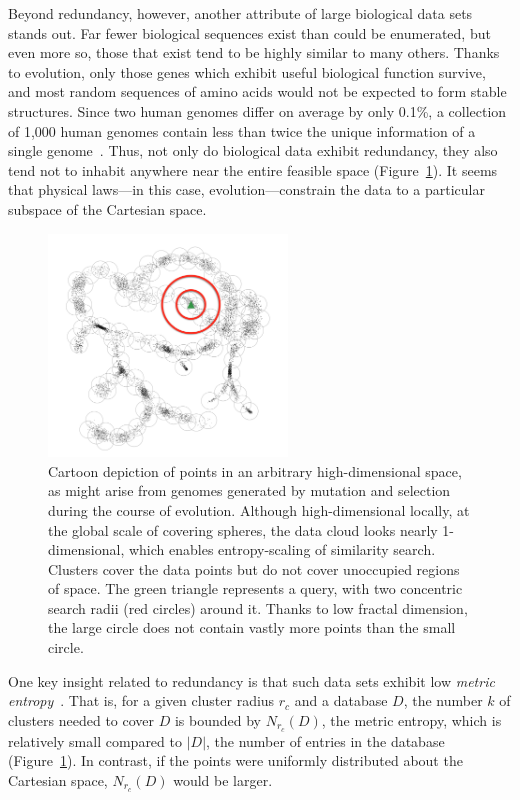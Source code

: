 \documentclass{acm_proc_article-sp}
\begin{document}
Beyond redundancy, however, another attribute of large biological data sets
stands out.
Far fewer biological sequences exist than could be enumerated, but even more so, those that exist tend to be highly similar to many others.
Thanks to 
evolution, only those genes
which exhibit useful biological function survive, and most
random sequences of amino acids would not be expected to form stable structures.
Since two human genomes differ on average by only 0.1\%, a collection of 1,000 human genomes contain less than twice the unique information of a single genome~\cite{loh2012compressive}.
Thus, not only do biological data exhibit redundancy, they also tend not to 
inhabit anywhere near the entire feasible space (Figure~\ref{fig:dataspace}).
It seems that physical laws---in this case, evolution---constrain the data to a particular subspace of the Cartesian space.

\begin{figure}[htb!]
\centering
\includegraphics[width=2.5in]{assets/treepoints-fractal.png}
\caption{Cartoon depiction of points in an arbitrary high-dimensional space, 
as might arise from genomes generated by mutation and selection during the 
course of evolution. 
Although high-dimensional locally, at the global scale of covering spheres, the 
data cloud looks nearly 1-dimensional, which enables entropy-scaling of 
similarity search. Clusters cover the data points but do not cover unoccupied 
regions of space.
The green triangle represents a query, with two concentric search radii (red 
circles) around it. Thanks to low fractal dimension, the large circle does
not contain vastly more points than the small circle.}
\label{fig:dataspace}
\end{figure}

One key insight related to redundancy
is that such data sets exhibit
low \emph{metric entropy}~\cite{yu2015entropy}.
That is, for a given cluster radius $r_c$ and a database $D$, the number $k$ 
of clusters needed to cover $D$ is bounded by $N_{r_c} (D)$, the metric 
entropy, which is relatively small compared to
$|D|$, the number of entries in the database (Figure~\ref{fig:dataspace}).
In contrast, if the points were uniformly distributed about the Cartesian space,
$N_{r_c} (D)$ would be larger.
\end{document}
